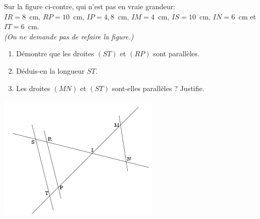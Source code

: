 
\begin{multicols}{2}
Sur la figure ci-contre, qui n'est pas en
vraie grandeur:\\
$IR=8$~cm, $RP=10$~cm, $IP=4,8$~cm, $IM=4$~cm,
$IS=10$~cm, $IN=6$~cm et $IT=6$~cm.\\
\textit{(On ne demande pas de refaire la figure.)}
\begin{enumerate}
\item Démontre que les droites $(ST)$ et $(RP)$ sont parallèles.
\item Déduis-en la longueur $ST$.
\item Les droites $(MN)$ et $(ST)$ sont-elles parallèles ? Justifie.
\end{enumerate}
\includegraphics[scale=1]{TR-exo29.png} 
\end{multicols}
